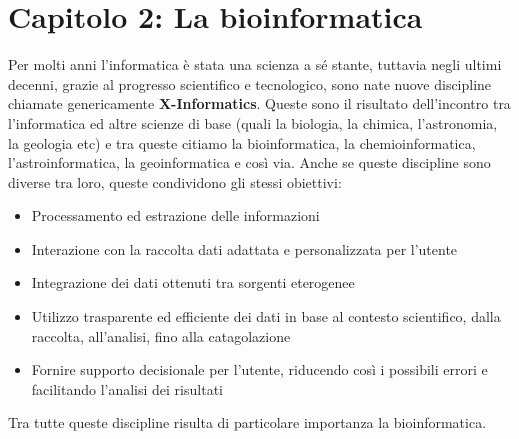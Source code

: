 \chapter{Capitolo 2: La bioinformatica}
Per molti anni l'informatica è stata una scienza a sé stante, tuttavia negli ultimi decenni, grazie al progresso scientifico e tecnologico, sono nate nuove discipline chiamate genericamente \textbf{X-Informatics}. Queste sono il risultato dell'incontro tra l'informatica ed altre scienze di base (quali la biologia, la chimica, l'astronomia, la geologia etc) e tra queste citiamo la bioinformatica, la chemioinformatica, l'astroinformatica, la geoinformatica e così via.
Anche se queste discipline sono diverse tra loro, queste condividono gli stessi obiettivi:
\begin{itemize}
	\item Processamento ed estrazione delle informazioni
	\item Interazione con la raccolta dati adattata e personalizzata per l'utente
	\item Integrazione dei dati ottenuti tra sorgenti eterogenee
	\item Utilizzo trasparente ed efficiente dei dati in base al contesto scientifico, dalla raccolta, all'analisi, fino alla catagolazione
	\item Fornire supporto decisionale per l'utente, riducendo così i possibili errori e facilitando l'analisi dei risultati
\end{itemize}
Tra tutte queste discipline risulta di particolare importanza la bioinformatica.
